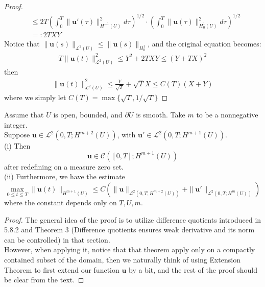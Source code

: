 \documentclass{article}
\begin{document}
\begin{proof}
\begin{align*}
        &\leq 2T\left(\int_0^T \|\textbf{u}'(\tau)\|_{H^{-1}(U)}^2d\tau\right)^{1/2}\cdot\left(\int_0^T\|\textbf{u}(\tau)\|_{H_0^1(U)}^2d\tau \right)^{1/2} \\
        &=:2T XY
    \end{align*}
    Notice that $\|\textbf{u}(s)\|_{\mathscr{L}^2(U)}\leq\|\textbf{u}(s)\|_{H_0^1}$, and the original equation becomes:
    \begin{align*}
        T\|\textbf{u}(t)\|_{\mathscr{L}^2(U)}^2\leq Y^2 + 2TXY\leq (Y+TX)^2
    \end{align*}
    then
    \begin{align*}
        \|\textbf{u}(t)\|^2_{\mathscr{L}^2(U)}\leq \frac{Y}{\sqrt{T}}+\sqrt{T}X\leq C(T)(X+Y)
    \end{align*}
    where we simply let $C(T)=\max\{\sqrt{T}, 1/\sqrt{T}\}$
\end{proof}

\begin{Th}
    Assume that $U$ is open, bounded, and $\partial U$ is smooth. Take $m$ to be a nonnegative integer. \\
    \indent Suppose $\textbf{u}\in\mathscr{L}^2(0,T; H^{m+2}(U))$, with $\textbf{u}'\in\mathscr{L}^2(0,T;H^{m+1}(U))$. \\
    \indent (i) Then 
    $$
    \textbf{u}\in\mathscr{C}([0,T]; H^{m+1}(U)) 
    $$ after redefining on a measure zero set. \\
    \indent (ii) Furthermore, we have the estimate 
    $$
    \max_{0\leq t\leq T}\|\textbf{u}(t)\|_{H^{m+1}(U)}\leq C\left(\|\textbf{u}\|_{\mathscr{L}^2(0,T; H^{m+2}(U))}+\|\textbf{u}'\|_{\mathscr{L}^2(0,T; H^m(U))}\right)
    $$ where the constant depends only on $T,U,m$.
\end{Th}

\begin{proof}
    The general idea of the proof is to utilize difference quotients introduced in 5.8.2 and Theorem 3 (Difference quotients ensures weak derivative and its norm can be controlled) in that section. \\
    \indent However, when applying it, notice that that theorem apply only on a compactly contained subset of the domain, then we naturally think of using Extension Theorem to first extend our function $\textbf{u}$ by a bit, and the rest of the proof should be clear from the text.
\end{proof}
\end{document}
